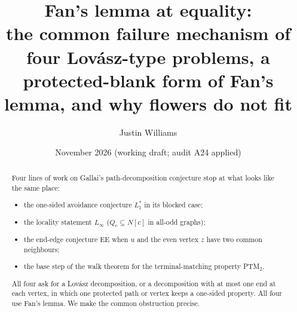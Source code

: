 \documentclass[11pt]{amsart}
\title[Fan's lemma at equality]{Fan's lemma at equality:\\ the common failure mechanism of four
Lov\'asz-type problems, a protected-blank form of Fan's lemma, and why flowers do not fit}
\author{Justin Williams}
\date{November 2026 (working draft; audit A24 applied)}
\theoremstyle{definition}
\begin{document}
\begin{abstract}
Four lines of work on Gallai's path-decomposition conjecture stop at what looks like the same
place:
\begin{itemize}
\item the one-sided avoidance conjecture $L_1^*$ in its blocked case;
\item the locality statement $L_\infty$ ($Q_c\subseteq N[c]$ in all-odd graphs);
\item the end-edge conjecture EE when $u$ and the even vertex $z$ have two common neighbours;
\item the base step of the walk theorem for the terminal-matching property PTM$_2$.
\end{itemize}
All four ask for a Lov\'asz decomposition, or a decomposition with at most one end at each vertex,
in which one protected path or vertex keeps a one-sided property. All four use Fan's lemma. We make
the common obstruction precise.


\end{abstract}
\end{document}
